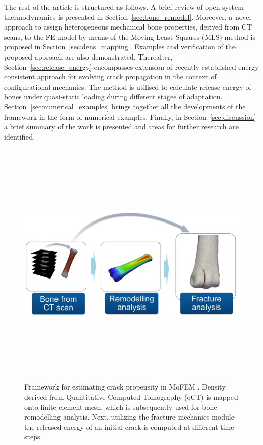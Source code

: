 \documentclass[11pt]{acmeArticle}
\numberwithin{equation}{section}
\begin{document}
The rest of the article is structured as follows.
A brief review of open system thermodynamics is presented in Section~\ref{sec:bone_remodel}.
Moreover, a novel approach to assign heterogeneous mechanical bone properties, derived from CT scans,
to the FE model by means of the Moving Least Squares (MLS) method is proposed in Section~\ref{sec:dens_mapping}.
Examples and verification of the proposed approach are also demonstrated. 
Thereafter, Section~\ref{sec:release_energy} encompasses extension of recently established energy consistent approach 
for evolving crack propagation in the context of configurational mechanics. 
The method is utilised to calculate release energy of bones under quasi-static loading during different stages of adaptation. 
Section~\ref{sec:numerical_examples} brings together all the developments of the framework in the form of numerical examples. 
Finally, in Section~\ref{sec:discussion} a brief summary of the work is presented and areas for further research are identified.
\begin{figure}[h!]
\begin{center}
\includegraphics[width=12cm,height=12cm]{Figures/framework.png}
\caption{Framework for estimating crack propensity in MoFEM \citep{mofem2017}. Density derived from Quantitative Computed Tomography (qCT) is mapped onto finite element mesh, which is subsequently used for bone remodelling analysis. 
Next, utilizing the fracture mechanics module the released energy of an initial crack is computed at different time steps.}
\label{fig:framework}
\end{center}
\end{figure}
\end{document}
